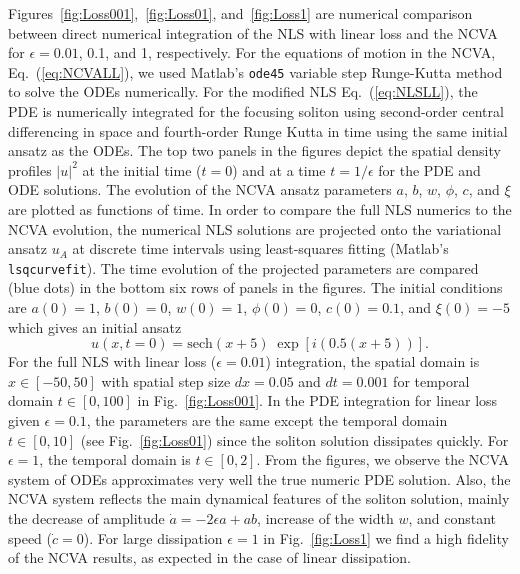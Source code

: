Figures~\ref{fig:Loss001},~\ref{fig:Loss01}, and~\ref{fig:Loss1} are numerical comparison between direct numerical integration of the NLS with linear loss and the NCVA for $\epsilon = 0.01$, 0.1, and 1, respectively.  For the equations of motion in the NCVA, Eq.~(\ref{eq:NCVALL}), we used Matlab's \texttt{ode45} variable step Runge-Kutta method to solve the ODEs numerically.  For the modified NLS Eq.~(\ref{eq:NLSLL}), the PDE is numerically integrated for the focusing soliton using second-order central differencing in space  and fourth-order Runge Kutta in time using the same initial ansatz as the ODEs.  The top two panels in the figures depict the spatial density profiles $|u|^2$ at the initial time ($t=0$) and at a time $t=1/\epsilon$ for the PDE and ODE solutions.  The evolution of the NCVA ansatz parameters $a$, $b$, $w$, $\phi$, $c$, and $\xi$ are plotted as functions of time.  In order to compare the full NLS numerics to the NCVA evolution, the numerical NLS solutions are projected onto the variational ansatz $u_A$ at discrete time intervals using least-squares fitting (Matlab's \texttt{lsqcurvefit}).  The time evolution of the projected parameters are compared (blue dots) in the bottom six rows of panels in the figures.
The initial conditions are $a(0) = 1$, $b(0)= 0$, $w(0) = 1$, $\phi(0) = 0$, $c(0) = 0.1$, and $\xi(0) = -5$ which gives an initial ansatz
\[ 
u(x, t=0) =  \mathrm{sech}(x+5) \; \exp[i(0.5(x+5))].
\]
For the full NLS with linear loss ($\epsilon = 0.01$) integration, the spatial domain is $x\in [-50,50]$ with spatial step size $dx = 0.05$ and $dt=0.001$ for temporal domain $t\in[0,100]$ in Fig.~\ref{fig:Loss001}.  In the PDE integration for linear loss given $\epsilon = 0.1$, the parameters are the same except the temporal domain $t\in[0,10]$ (see Fig.~\ref{fig:Loss01}) since the soliton solution dissipates quickly.  For $\epsilon = 1$, the temporal domain is $t\in[0,2]$.  
%
%
From the figures, we observe the NCVA system of ODEs approximates very well the true numeric PDE solution.  Also, the NCVA system reflects the main dynamical features of the soliton solution, mainly the decrease of amplitude $\dot{a} = -2\epsilon a + ab$, increase of the width $w$, and constant speed ($\dot{c} = 0$).  For large dissipation $\epsilon = 1$ %
in Fig.~\ref{fig:Loss1} we find a high fidelity of the NCVA results, as expected in the case of linear dissipation.

